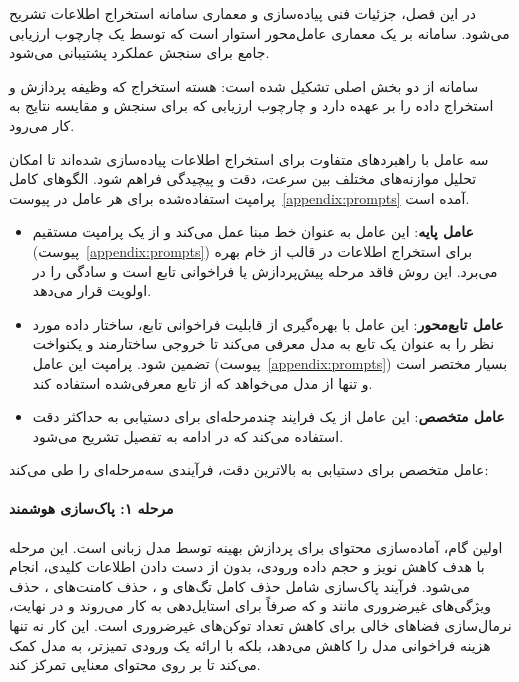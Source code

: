 
در این فصل، جزئیات فنی پیاده‌سازی و معماری سامانه استخراج اطلاعات تشریح می‌شود. سامانه بر یک معماری عامل‌محور استوار است که توسط یک چارچوب ارزیابی جامع برای سنجش عملکرد پشتیبانی می‌شود.


سامانه از دو بخش اصلی تشکیل شده است: هسته استخراج که وظیفه پردازش  و استخراج داده را بر عهده دارد و چارچوب ارزیابی که برای سنجش و مقایسه نتایج به کار می‌رود.

سه عامل با راهبردهای متفاوت برای استخراج اطلاعات پیاده‌سازی شده‌اند تا امکان تحلیل موازنه‌های مختلف بین سرعت، دقت و پیچیدگی فراهم شود. الگوهای کامل پرامپت استفاده‌شده برای هر عامل در پیوست~\ref{appendix:prompts} آمده است.

\begin{itemize}
    \item \textbf{عامل پایه}: این عامل به عنوان خط مبنا عمل می‌کند و از یک پرامپت مستقیم (پیوست~\ref{appendix:prompts}) برای استخراج اطلاعات در قالب  از  خام بهره می‌برد. این روش فاقد مرحله پیش‌پردازش یا فراخوانی تابع است و سادگی را در اولویت قرار می‌دهد.

    \item \textbf{عامل تابع‌محور}: این عامل با بهره‌گیری از قابلیت فراخوانی تابع، ساختار داده مورد نظر را به عنوان یک تابع به مدل معرفی می‌کند تا خروجی ساختارمند و یکنواخت تضمین شود. پرامپت این عامل (پیوست~\ref{appendix:prompts}) بسیار مختصر است و تنها از مدل می‌خواهد که از تابع معرفی‌شده استفاده کند.

    \item \textbf{عامل متخصص}: این عامل از یک فرایند چندمرحله‌ای برای دستیابی به حداکثر دقت استفاده می‌کند که در ادامه به تفصیل تشریح می‌شود.
\end{itemize}

عامل متخصص برای دستیابی به بالاترین دقت، فرآیندی سه‌مرحله‌ای را طی می‌کند:

\paragraph{مرحله ۱: پاک‌سازی هوشمند }
اولین گام، آماده‌سازی محتوای  برای پردازش بهینه توسط مدل زبانی است. این مرحله با هدف کاهش نویز و حجم داده ورودی، بدون از دست دادن اطلاعات کلیدی، انجام می‌شود. فرآیند پاک‌سازی شامل حذف کامل تگ‌های  و ، حذف کامنت‌های ، حذف ویژگی‌های غیرضروری مانند  و  که صرفاً برای استایل‌دهی به کار می‌روند و در نهایت، نرمال‌سازی فضاهای خالی برای کاهش تعداد توکن‌های غیرضروری است. این کار نه تنها هزینه فراخوانی مدل را کاهش می‌دهد، بلکه با ارائه یک ورودی تمیزتر، به مدل کمک می‌کند تا بر روی محتوای معنایی تمرکز کند.

